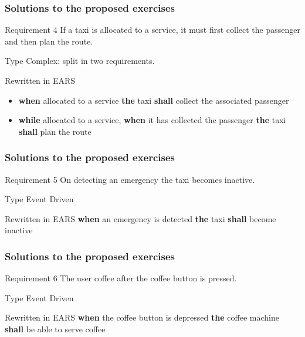 \documentclass[aspectratio=169]{beamer}
\newcommand{\earse}[3]{{\bf \color{mygreen}when} {#1} {\bf \color{mypurple}the} {#2} {\bf \color{mypurple}shall} {#3}}
\begin{document}
\begin{frame}
  \frametitle{Solutions to the proposed exercises}
  \begin{block}{Requirement 4}
    If a taxi is \alert{allocated} to a service, it must first \alert{collect} the passenger and then \alert{plan} the route.
  \end{block}
  \begin{block}{Type}
   Complex: split in two requirements.
  \end{block}
  \begin{block}{Rewritten in EARS}
  \begin{itemize}
    \item \earse{allocated to a service}{taxi}{collect the associated passenger}
    \item {\bf \color{mygreen} while} allocated to a service, \earse{it has collected the passenger}{taxi}{plan the route}
  \end{itemize}
  \end{block}
\end{frame}

\begin{frame}
  \frametitle{Solutions to the proposed exercises}
  \begin{block}{Requirement 5}
    On detecting an \alert{emergency} the taxi becomes inactive.
  \end{block}
  \begin{block}{Type}
   Event Driven
  \end{block}
  \begin{block}{Rewritten in EARS}
   \earse{an emergency is detected}{taxi}{become inactive}
  \end{block}
\end{frame}

\begin{frame}
  \frametitle{Solutions to the proposed exercises}
  \begin{block}{Requirement 6}
    The user  \alert{coffee} after the \alert{coffee button} is pressed.
  \end{block}
  \begin{block}{Type}
   Event Driven
  \end{block}
  \begin{block}{Rewritten in EARS}
   \earse{the coffee button is depressed}{coffee machine}{be able to serve coffee}
  \end{block}
\end{frame}
\end{document}
